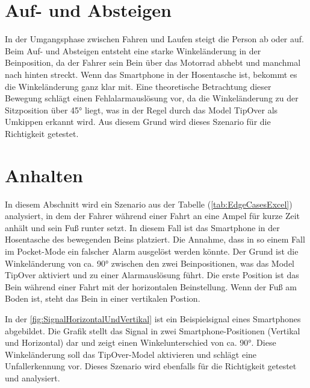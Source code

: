 \section{Auf- und Absteigen} \label{sec:AufAbsteigen}
In der Umgangsphase zwischen Fahren und Laufen steigt die Person ab oder auf. Beim Auf- und Absteigen entsteht eine starke Winkeländerung in der Beinposition, da der Fahrer sein Bein über das Motorrad abhebt und manchmal nach hinten streckt. Wenn das Smartphone in der Hosentasche ist, bekommt es die Winkeländerung ganz klar mit.
Eine theoretische Betrachtung dieser Bewegung schlägt einen Fehlalarmauslösung vor, da die Winkeländerung zu der Sitzposition über \ang{45} liegt, was in der Regel durch das Model \glqq TipOver\grqq{} als Umkippen erkannt wird.
Aus diesem Grund wird dieses Szenario für die Richtigkeit getestet.






\section{Anhalten} \label{sec:AmpelStehen}
In diesem Abschnitt wird ein Szenario aus der Tabelle (\autoref{tab:EdgeCasesExcel}) analysiert, in dem der Fahrer während einer Fahrt an eine Ampel für kurze Zeit anhält und sein Fuß runter setzt. In diesem Fall ist das Smartphone in der Hosentasche des bewegenden Beins platziert.
Die Annahme, dass in so einem Fall im Pocket-Mode ein falscher Alarm ausgelöst werden könnte. Der Grund ist die Winkeländerung von ca. \ang{90} zwischen den zwei Beinpositionen, was das Model \glqq TipOver\grqq{} aktiviert und zu einer Alarmauslösung führt.
Die erste Position ist das Bein während einer Fahrt mit der horizontalen Beinstellung. Wenn der Fuß am Boden ist, steht das Bein in einer vertikalen Postion.

In der \autoref{fig:SignalHorizontalUndVertikal} ist ein Beispielsignal eines Smartphones abgebildet. Die Grafik stellt das Signal in zwei Smartphone-Positionen (Vertikal und Horizontal) dar und zeigt einen Winkelunterschied von ca. \ang{90}. Diese Winkeländerung soll das \glqq TipOver\grqq{}-Model aktivieren und schlägt eine Unfallerkennung vor.
Dieses Szenario wird ebenfalls für die Richtigkeit getestet und analysiert.

